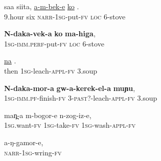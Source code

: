 \documentclass[output=paper]{LSP/langsci}
\begin{document}
 \begin{exe}
 \label{Saapp13}
\gll saa siita,  \underline{a-m-bek-e} \underline{ko} \underline{}.\\
\textsc{9}.hour  six  \textsc{narr}-\textsc{1sg}-put-\textsc{fv}  \textsc{loc} \textsc{6}-stove\\
\glt {}
\end{exe}

 \begin{exe}
 \label{Saapp14}
\gll \textbf{N-daka-vek-a} \textbf{ko} \textbf{ma-higa},\\
\textsc{1sg-imm}.\textsc{perf}-put-\textsc{fv}  \textsc{loc}  \textsc{6}-stove\\
\glt {}
\end{exe}

 \begin{exe}
 \label{Saapp15}
\gll \underline{na} \underline{} \underline{}.\\
then  \textsc{1sg}-leach-\textsc{appl}-\textsc{fv} \textsc{3}.soup\\
\glt {}
\end{exe}

 \begin{exe}
 \label{Saapp16}
\gll \textbf{N-daka-mor-a} \textbf{gw-a-kerek-el-a} \textbf{muɲu},\\
\textsc{1sg}-\textsc{imm.pf}-finish-\textsc{fv} \textsc{3}-\textsc{past}?-leach-\textsc{appl}-\textsc{fv}  \textsc{3}.soup  \\
\glt {}
\end{exe}

 \begin{exe}
 \label{Saapp17}
\gll man̪-a m-bogor-e n-zog-iz-e,\\
\textsc{1sg}.want-\textsc{fv}  \textsc{1sg}-take-\textsc{fv}  \textsc{1sg}-wash-\textsc{appl}-\textsc{fv}\\
\glt {}
\end{exe}

 \begin{exe}
 \label{Saapp18}
\gll a-ŋ-gamor-e,\\
\textsc{narr}-\textsc{1sg}-wring-\textsc{fv}\\
\glt {}
\end{exe}
\end{document}
